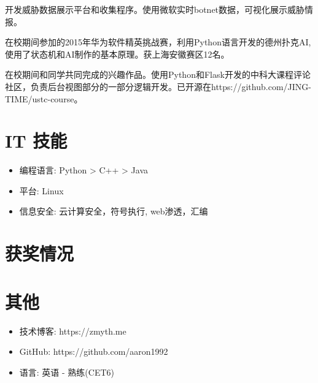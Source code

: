 \documentclass{resume}
\begin{document}
\begin{onehalfspacing}
	开发威胁数据展示平台和收集程序。使用微软实时botnet数据，可视化展示威胁情报。
\end{onehalfspacing}

\begin{onehalfspacing}
	在校期间参加的2015年华为软件精英挑战赛，利用Python语言开发的德州扑克AI, 使用了状态机和AI制作的基本原理。获上海安徽赛区12名。
\end{onehalfspacing}

\begin{onehalfspacing}
在校期间和同学共同完成的兴趣作品。使用Python和Flask开发的中科大课程评论社区，负责后台视图部分的一部分逻辑开发。已开源在https://github.com/JING-TIME/ustc-course。
\end{onehalfspacing}


\section{IT 技能}
\begin{itemize}[parsep=0.5ex]
  \item 编程语言: Python > C++ > Java
  \item 平台: Linux
  \item 信息安全: 云计算安全，符号执行, web渗透，汇编
\end{itemize}

\section{获奖情况}

\section{其他}
\begin{itemize}[parsep=0.5ex]
  \item 技术博客: https://zmyth.me
  \item GitHub: https://github.com/aaron1992
  \item 语言: 英语 - 熟练(CET6)
\end{itemize}

%
%
\end{document}
